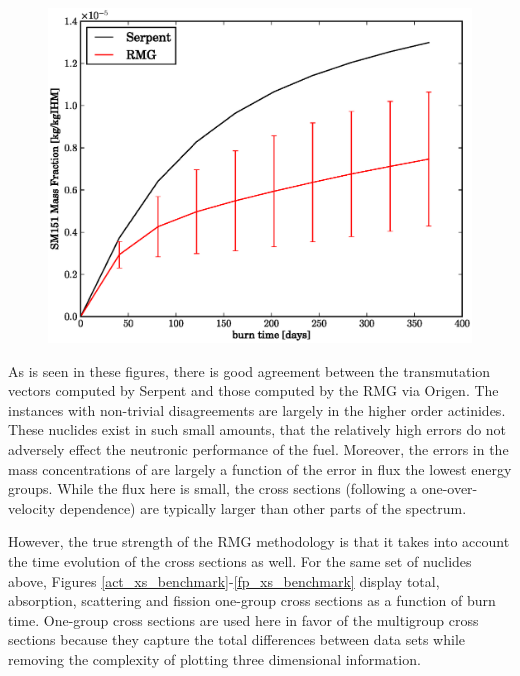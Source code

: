 \begin{figure}[htbp]
\begin{center}
\includegraphics[scale=0.3]{multigroup_method/figs/benchmark/SM151_Mass_Fraction_.eps}
\end{center}
\end{figure}


As is seen in these figures, there is good agreement between the transmutation vectors computed by
Serpent and those computed by the RMG via Origen.  The instances with non-trivial disagreements are 
largely in the higher order actinides.  These nuclides exist in such small amounts, that the relatively
high errors do not adversely effect the neutronic performance of the fuel.   Moreover, the errors in the
mass concentrations of are largely a function of the error in flux the lowest energy groups.  While 
the flux here is small, the cross sections (following a one-over-velocity dependence) are typically 
larger than other parts of the spectrum.


However, the true strength of the RMG methodology is 
that it takes into account the time evolution of the cross sections as well.  For the same set 
of nuclides above, Figures \ref{act_xs_benchmark}-\ref{fp_xs_benchmark} display total, absorption,
scattering and fission one-group cross sections as a function of burn time.  One-group cross sections 
are used here in favor of the multigroup cross sections because they capture the total differences 
between data sets while removing the complexity of plotting three dimensional information.

